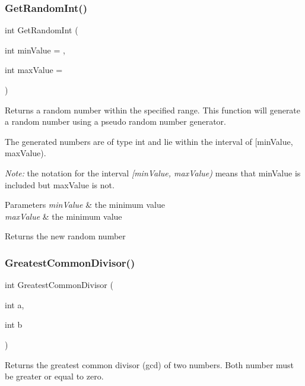 \subsubsection{\texorpdfstring{Get\+Random\+Int()}{GetRandomInt()}}
{\footnotesize\ttfamily int Get\+Random\+Int (\begin{DoxyParamCaption}\item[{int}]{min\+Value = {},  }\item[{int}]{max\+Value = {} }\end{DoxyParamCaption})}

Returns a random number within the specified range. This function will generate a random number using a pseudo random number generator.

The generated numbers are of type {\ttfamily int} and lie within the interval of \mbox{[}min\+Value, max\+Value).

{\itshape Note\+:} the notation for the interval {\itshape \mbox{[}min\+Value, max\+Value)} means that {\ttfamily min\+Value} is included but {\ttfamily max\+Value} is not.


\begin{DoxyParams}{Parameters}
{\em min\+Value} & the minimum value \\
\hline
{\em max\+Value} & the minimum value \\
\hline
\end{DoxyParams}
\begin{DoxyReturn}{Returns}
the new random number 
\end{DoxyReturn}
\mbox{\label{group__math__group_gaaf5732ddb11cda2a05f0f978265a114e}} 
\subsubsection{\texorpdfstring{Greatest\+Common\+Divisor()}{GreatestCommonDivisor()}}
{\footnotesize\ttfamily int Greatest\+Common\+Divisor (\begin{DoxyParamCaption}\item[{int}]{a,  }\item[{int}]{b }\end{DoxyParamCaption})}

Returns the greatest common divisor (gcd) of two numbers. Both number must be greater or equal to zero.


